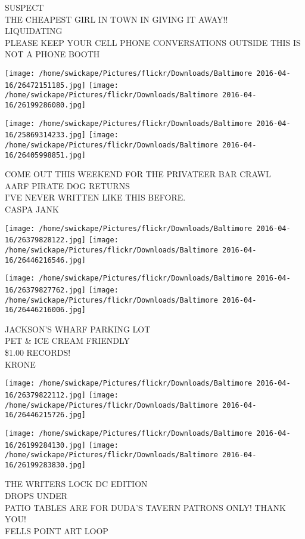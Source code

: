 \documentclass[10pt,letterpaper]{article}
\begin{document}
SUSPECT\\
THE CHEAPEST GIRL IN TOWN IN GIVING IT AWAY!!\\
LIQUIDATING\\
PLEASE KEEP YOUR CELL PHONE CONVERSATIONS OUTSIDE THIS IS NOT A PHONE BOOTH\\
\pagebreak

\texttt{[image: /home/swickape/Pictures/flickr/Downloads/Baltimore 2016-04-16/26472151185.jpg]}
\texttt{[image: /home/swickape/Pictures/flickr/Downloads/Baltimore 2016-04-16/26199286080.jpg]}

\texttt{[image: /home/swickape/Pictures/flickr/Downloads/Baltimore 2016-04-16/25869314233.jpg]}
\texttt{[image: /home/swickape/Pictures/flickr/Downloads/Baltimore 2016-04-16/26405998851.jpg]}

COME OUT THIS WEEKEND FOR THE PRIVATEER BAR CRAWL\\
AARF PIRATE DOG RETURNS\\
I'VE NEVER WRITTEN LIKE THIS BEFORE.\\
CASPA JANK\\
\pagebreak

\texttt{[image: /home/swickape/Pictures/flickr/Downloads/Baltimore 2016-04-16/26379828122.jpg]}
\texttt{[image: /home/swickape/Pictures/flickr/Downloads/Baltimore 2016-04-16/26446216546.jpg]}

\texttt{[image: /home/swickape/Pictures/flickr/Downloads/Baltimore 2016-04-16/26379827762.jpg]}
\texttt{[image: /home/swickape/Pictures/flickr/Downloads/Baltimore 2016-04-16/26446216006.jpg]}

JACKSON'S WHARF PARKING LOT\\
PET \& ICE CREAM FRIENDLY\\
\$1.00 RECORDS!\\
KRONE\\
\pagebreak

\texttt{[image: /home/swickape/Pictures/flickr/Downloads/Baltimore 2016-04-16/26379822112.jpg]}
\texttt{[image: /home/swickape/Pictures/flickr/Downloads/Baltimore 2016-04-16/26446215726.jpg]}

\texttt{[image: /home/swickape/Pictures/flickr/Downloads/Baltimore 2016-04-16/26199284130.jpg]}
\texttt{[image: /home/swickape/Pictures/flickr/Downloads/Baltimore 2016-04-16/26199283830.jpg]}

THE WRITERS LOCK DC EDITION\\
DROPS UNDER\\
PATIO TABLES ARE FOR DUDA'S TAVERN PATRONS ONLY!  THANK YOU!\\
FELLS POINT ART LOOP\\
\pagebreak
\end{document}

